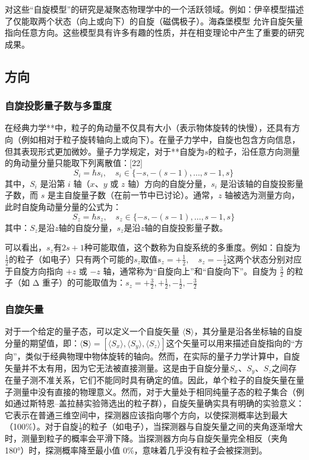对这些“自旋模型”的研究是凝聚态物理学中的一个活跃领域。例如：伊辛模型描述了仅能取两个状态（向上或向下）的自旋（磁偶极子）。海森堡模型 允许自旋矢量指向任意方向。这些模型具有许多有趣的性质，并在相变理论中产生了重要的研究成果。
\subsection{方向}  
\subsubsection{自旋投影量子数与多重度} 
在经典力学**中，粒子的角动量不仅具有大小（表示物体旋转的快慢），还具有方向（例如相对于粒子旋转轴向上或向下）。在量子力学中，自旋也包含方向信息，但其表现形式更加微妙。量子力学规定，对于**自旋为\(s\)的粒子，沿任意方向测量的角动量分量只能取下列离散值：[22]  
\[
S_i = \hbar s_i, \quad s_i \in \{-s, -(s-1), \dots , s-1, s\}~
\]  
其中，\( S_i \) 是沿第 \( i \) 轴（\( x \)、\( y \) 或 \( z \) 轴）方向的自旋分量，\( s_i \) 是沿该轴的自旋投影量子数，而 \( s \) 是主自旋量子数（在前一节中已讨论）。通常，\(z\) 轴被选为测量方向，此时自旋角动量分量的公式为：  
\[
S_z = \hbar s_z, \quad s_z \in \{-s, -(s-1), \dots , s-1, s\}~
\]  
其中：\(S_z\)是沿\(z\)轴的自旋分量，\(s_z\)是沿\(z\)轴的自旋投影量子数。  

可以看出，\(s_z\)有\( 2s + 1 \)种可能取值，这个数称为自旋系统的多重度。例如：自旋为 \( \frac{1}{2}\)的粒子（如电子）只有两个可能的\(s_z\)取值\(s_z = +\frac{1}{2}, \quad s_z = -\frac{1}{2}\)这两个状态分别对应于自旋方向指向 \( +z \) 或 \( -z \) 轴，通常称为“自旋向上”和“自旋向下”。自旋为 \( \frac{3}{2} \) 的粒子（如 Δ 重子）的可能取值为：\(s_z = +\frac{3}{2}, +\frac{1}{2}, -\frac{1}{2}, -\frac{3}{2}\)  
\subsubsection{自旋矢量} 
对于一个给定的量子态，可以定义一个自旋矢量 \( \langle \mathbf{S} \rangle \)，其分量是沿各坐标轴的自旋分量的期望值，即：\(\langle \mathbf{S} \rangle = [\langle S_x \rangle, \langle S_y \rangle, \langle S_z \rangle]\)这个矢量可以用来描述自旋指向的“方向”，类似于经典物理中物体旋转的轴向。然而，在实际的量子力学计算中，自旋矢量并不太有用，因为它无法被直接测量。这是由于自旋分量\( S_x \)、\( S_y \)、\( S_z \)之间存在量子测不准关系，它们不能同时具有确定的值。因此，单个粒子的自旋矢量在量子测量中没有直接的物理意义。然而，对于大量处于相同纯量子态的粒子集合（例如通过斯特恩–盖拉赫实验筛选出的粒子群），自旋矢量确实具有明确的实验意义：它表示在普通三维空间中，探测器应该指向哪个方向，以使探测概率达到最大（100\%）。对于自旋\(\frac{1}{2}\)的粒子（如电子），当探测器与自旋矢量之间的夹角逐渐增大时，测量到粒子的概率会平滑下降。当探测器方向与自旋矢量完全相反（夹角 180°）时，探测概率降至最小值 0\%，意味着几乎没有粒子会被探测到。

